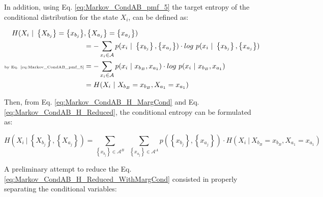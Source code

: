 In addition, using Eq. \eqref{eq:Markov_CondAB_pmf_5} the target entropy of the conditional distribution for the state $X_{i}$, can be defined as:
                   
\begin{align}
\label{eq:Markov_CondAB_H_Reduced}
	H(X_{i} \ | \ \left\{X_{b_{j}}\right\} = \left\{x_{b_{j}}\right\} & , \left\{X_{a_{j}}\right\} = \left\{x_{a_{j}}\right\}) \nonumber \\
	& = - \sum_{ x_{i} \in \mathcal{A} }{ p(x_{i} \ | \ \left\{x_{b_{j}}\right\} , \left\{x_{a_{j}}\right\}) \cdot log \ p(x_{i} \ | \ \left\{x_{b_{j}}\right\} , \left\{x_{a_{j}}\right\})   }   \nonumber \\
	    \text{\tiny{by Eq. \eqref{eq:Markov_CondAB_pmf_5}}}  & =  - \sum_{ x_{i} \in \mathcal{A} }{ p(x_{i} \ | \ x_{b_{B}} , x_{a_{1}}) \cdot log \ p(x_{i} \ | \ x_{b_{B}} , x_{a_{1}})   }   \nonumber \\
			 & =  H(X_{i} \ | \ X_{b_{B}} = x_{b_{B}} , X_{a_{1}} = x_{a_{1}})
\end{align}

Then, from Eq. \eqref{eq:Markov_CondAB_H_MargCond} and Eq. \eqref{eq:Markov_CondAB_H_Reduced}, the conditional entropy can be formulated as:

\begin{equation}
\label{eq:Markov_CondAB_H_Reduced_WithMargCond}
	H(X_{i} \ | \ \left\{X_{b_{j}}\right\} , \left\{X_{a_{j}}\right\}) = \sum_{  \left\{x_{b_{j}}\right\} \in \mathcal{A}^{B}  }{ }{ \ \ \sum_{  \left\{x_{a_{j}}\right\} \in \mathcal{A}^{A}      }{ p(\left\{x_{b_{j}}\right\} , \left\{x_{a_{j}}\right\}) \cdot H( X_{i} \ | \ X_{b_{B}} = x_{b_{B}} , X_{a_{1}} = x_{a_{1}})   }}
\end{equation}

A preliminary attempt to reduce the Eq. \eqref{eq:Markov_CondAB_H_Reduced_WithMargCond} consisted in properly separating the conditional variables:


